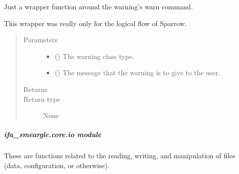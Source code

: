 \documentclass[letterpaper,10pt,english]{sphinxmanual}
\begin{document}

\begin{fulllineitems}
\label{\detokenize{docstrings/ifa_smeargle.core.error:ifa_smeargle.core.error.ifas_warning}}
Just a wrapper function around the warning’s warn command.

This wrapper was really only for the logical flow of Sparrow.
\begin{quote}\begin{description}
\item[{Parameters}] \leavevmode\begin{itemize}
\item {} 
 () \textendash{} The warning class type.

\item {} 
 () \textendash{} The message that the warning is to give to the user.

\end{itemize}

\item[{Returns}] \leavevmode


\item[{Return type}] \leavevmode
None

\end{description}\end{quote}

\end{fulllineitems}



\subparagraph{ifa\_smeargle.core.io module}
\label{\detokenize{docstrings/ifa_smeargle.core.io:module-ifa_smeargle.core.io}}\label{\detokenize{docstrings/ifa_smeargle.core.io:ifa-smeargle-core-io-module}}\label{\detokenize{docstrings/ifa_smeargle.core.io::doc}}
These are functions related to the reading, writing, and
manipulation of files (data, configuration, or otherwise).
\end{document}
